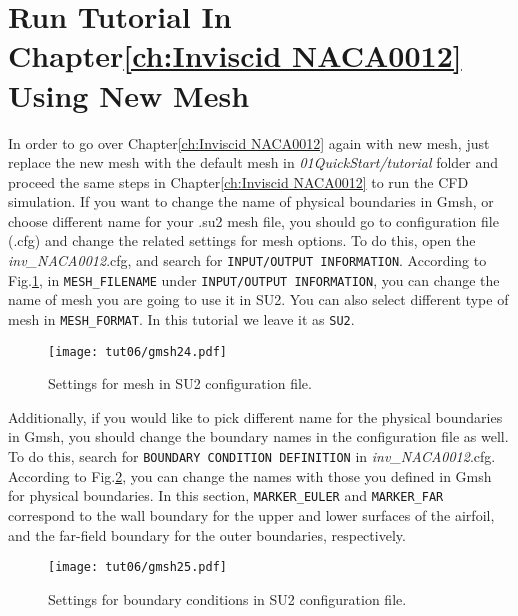 \section{Run Tutorial In Chapter\ref{ch:Inviscid NACA0012} Using New Mesh}
In order to go over Chapter\ref{ch:Inviscid NACA0012} again with new mesh, just replace the new mesh with the default mesh in \textit{01QuickStart/tutorial} folder and proceed the same steps in Chapter\ref{ch:Inviscid NACA0012} to run the CFD simulation. If you want to change the name of physical boundaries in Gmsh, or choose different name for your .su2 mesh file, you should go to configuration file (.cfg) and change the related settings for mesh options. To do this, open the \textit{inv\_NACA0012}.cfg, and search for \texttt{INPUT/OUTPUT INFORMATION}. According to Fig.\ref{fig6:gmsh24}, in \texttt{MESH\_FILENAME} under \texttt{INPUT/OUTPUT INFORMATION}, you can change the name of mesh you are going to use it in SU2. You can also select different type of mesh in \texttt{MESH\_FORMAT}. In this tutorial we leave it as \texttt{SU2}.
\begin{figure}[htbp]
    \centering
    \texttt{[image: tut06/gmsh24.pdf]}
    \caption{Settings for mesh in SU2 configuration file.}
    \label{fig6:gmsh24}
\end{figure}
Additionally, if you would like to pick different name for the physical boundaries in Gmsh, you should change the boundary names in the configuration file as well. To do this, search for \texttt{BOUNDARY CONDITION DEFINITION} in \textit{inv\_NACA0012}.cfg. According to Fig.\ref{fig6:gmsh25}, you can change the names with those you defined in Gmsh for physical boundaries. In this section, \texttt{MARKER\_EULER} and \texttt{MARKER\_FAR} correspond to the wall boundary for the upper and lower surfaces of the airfoil, and the far-field boundary for the outer boundaries, respectively.
\begin{figure}[htbp]
    \centering
    \texttt{[image: tut06/gmsh25.pdf]}
    \caption{Settings for boundary conditions in SU2 configuration file.}
    \label{fig6:gmsh25}
\end{figure}
